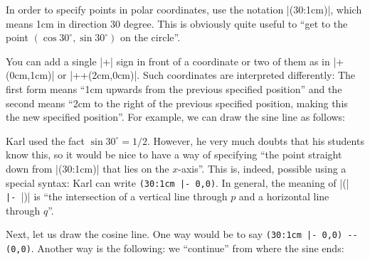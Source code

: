 In order to specify points in polar coordinates, use the notation |(30:1cm)|,
which means 1cm in direction 30 degree. This is obviously quite useful to ``get
to the point $(\cos 30^\circ,\sin 30^\circ)$ on the circle''.

You can add a single |+| sign in front of a coordinate or two of them as in
|+(0cm,1cm)| or |++(2cm,0cm)|. Such coordinates are interpreted differently:
The first form means ``1cm upwards from the previous specified position'' and
the second means ``2cm to the right of the previous specified position, making
this the new specified position''. For example, we can draw the sine line as
follows:
%
\begin{codeexample}[]
\end{codeexample}

Karl used the fact $\sin 30^\circ = 1/2$. However, he very much doubts that his
students know this, so it would be nice to have a way of specifying ``the point
straight down from |(30:1cm)| that lies on the $x$-axis''. This is, indeed,
possible using a special syntax: Karl can write \verb!(30:1cm |- 0,0)!. In
general, the meaning of |(|\verb! |- !|)| is ``the intersection
of a vertical line through $p$ and a horizontal line through $q$''.

Next, let us draw the cosine line. One way would be to say
\verb!(30:1cm |- 0,0) -- (0,0)!. Another way is the following: we ``continue''
from where the sine ends:
%
\begin{codeexample}[]
\end{codeexample}

